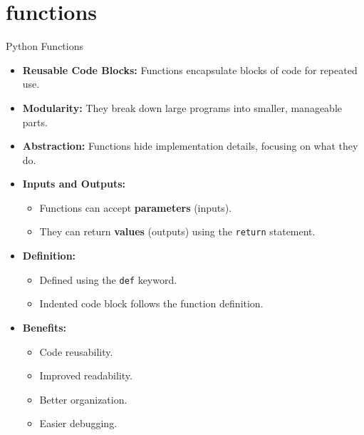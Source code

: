 \section{functions}
\label{sec:functions}  


\begin{frame}{Python Functions}
    \begin{itemize}
        \item \textbf{Reusable Code Blocks:} Functions encapsulate blocks of code for repeated use.
        \item \textbf{Modularity:} They break down large programs into smaller, manageable parts.
        \item \textbf{Abstraction:} Functions hide implementation details, focusing on what they do.
        \item \textbf{Inputs and Outputs:}
            \begin{itemize}
                \item Functions can accept \textbf{parameters} (inputs).
                \item They can return \textbf{values} (outputs) using the \texttt{return} statement.
            \end{itemize}
        \item \textbf{Definition:}
            \begin{itemize}
                \item Defined using the \texttt{def} keyword.
                \item Indented code block follows the function definition.
            \end{itemize}
        \item \textbf{Benefits:}
            \begin{itemize}
                \item Code reusability.
                \item Improved readability.
                \item Better organization.
                \item Easier debugging.
            \end{itemize}
    \end{itemize}
    
    \end{frame}



